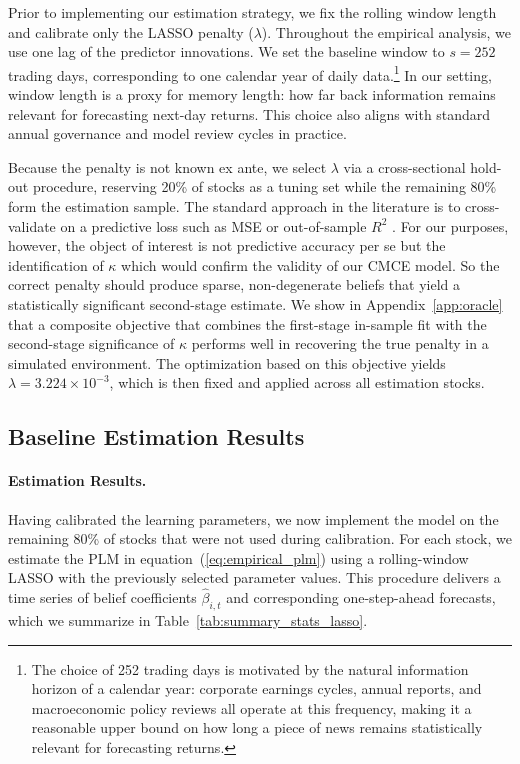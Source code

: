 Prior to implementing our estimation strategy, we fix the rolling window length and calibrate only the LASSO penalty ($\lambda$).
Throughout the empirical analysis, we use one lag of the predictor innovations.
We set the baseline window to $s=252$ trading days, corresponding to one calendar year of daily data.\footnote{The choice of 252 trading days is motivated by the natural information horizon of a calendar year: corporate earnings cycles, annual reports, and macroeconomic policy reviews all operate at this frequency, making it a reasonable upper bound on how long a piece of news remains statistically relevant for forecasting returns.}
In our setting, window length is a proxy for memory length: how far back information remains relevant for forecasting next-day returns.
This choice also aligns with standard annual governance and model review cycles in practice.

Because the penalty is not known ex ante, we select $\lambda$ via a cross-sectional hold-out procedure, reserving 20\% of stocks as a tuning set while the remaining 80\% form the estimation sample.
The standard approach in the literature is to cross-validate on a predictive loss such as MSE or out-of-sample $R^2$ \citep{Chinco2019, Gu2020, Feng2020}.
For our purposes, however, the object of interest is not predictive accuracy per se but the identification of $\kappa$ which would confirm the validity of our CMCE model.
So the correct penalty should produce sparse, non-degenerate beliefs that yield a statistically significant second-stage estimate.
We show in Appendix~\ref{app:oracle} that a composite objective that combines the first-stage in-sample fit with the second-stage significance of $\kappa$ performs well in recovering the true penalty in a simulated environment.
The optimization based on this objective yields $\lambda = 3.224 \times 10^{-3}$, which is then fixed and applied across all estimation stocks.

\subsection{Baseline Estimation Results}\label{subsec:empirical_baseline_results}

\paragraph{Estimation Results.}

Having calibrated the learning parameters, we now implement the model on the remaining 80\% of stocks that were not used during calibration. For each stock, we estimate the PLM in equation~(\ref{eq:empirical_plm}) using a rolling-window LASSO with the previously selected parameter values. This procedure delivers a time series of belief coefficients ${\hat{\beta}_{i,t}}$ and corresponding one-step-ahead forecasts, which we summarize in Table~\ref{tab:summary_stats_lasso}.

